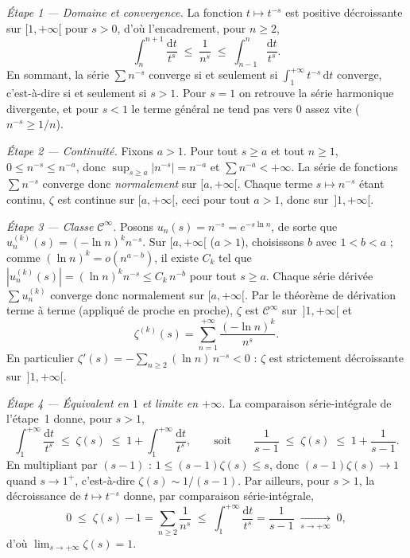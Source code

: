 \begin{mdframed}[style=proofbar]
  \textit{Étape 1 — Domaine et convergence.}
  La fonction $t\mapsto t^{-s}$ est positive décroissante sur $[1,+\infty[$ pour
  $s>0$, d'où l'encadrement, pour $n\geq 2$,
  \[
    \int_{n}^{n+1}\frac{\mathrm{d}t}{t^{s}}
    \;\leq\; \frac{1}{n^{s}}
    \;\leq\; \int_{n-1}^{n}\frac{\mathrm{d}t}{t^{s}}.
  \]
  En sommant, la série $\sum n^{-s}$ converge si et seulement si
  $\int_{1}^{+\infty} t^{-s}\,\mathrm{d}t$ converge, c'est-à-dire si et
  seulement si $s>1$. Pour $s=1$ on retrouve la série harmonique divergente, et
  pour $s<1$ le terme général ne tend pas vers $0$ assez vite ($n^{-s}\geq 1/n$).

  \medskip
  \textit{Étape 2 — Continuité.}
  Fixons $a>1$. Pour tout $s\geq a$ et tout $n\geq 1$, $0\leq n^{-s}\leq n^{-a}$,
  donc $\sup_{s\geq a}|n^{-s}|=n^{-a}$ et $\sum n^{-a}<+\infty$. La série de
  fonctions $\sum n^{-s}$ converge donc \emph{normalement} sur $[a,+\infty[$.
  Chaque terme $s\mapsto n^{-s}$ étant continu, $\zeta$ est continue sur
  $[a,+\infty[$, ceci pour tout $a>1$, donc sur $\,]1,+\infty[$.

  \medskip
  \textit{Étape 3 — Classe $\mathcal{C}^{\infty}$.}
  Posons $u_{n}(s)=n^{-s}=e^{-s\ln n}$, de sorte que $u_{n}^{(k)}(s)=(-\ln
  n)^{k}n^{-s}$. Sur $[a,+\infty[$ ($a>1$), choisissons $b$ avec
  $1<b<a$ ; comme $(\ln n)^{k}=o(n^{a-b})$, il existe $C_{k}$ tel que
  $|u_{n}^{(k)}(s)|=(\ln n)^{k}n^{-s}\leq C_{k}\,n^{-b}$ pour tout $s\geq a$.
  Chaque série dérivée $\sum u_{n}^{(k)}$ converge donc normalement sur
  $[a,+\infty[$. Par le théorème de dérivation terme à terme (appliqué de proche
  en proche), $\zeta$ est $\mathcal{C}^{\infty}$ sur $\,]1,+\infty[$ et
  \[
    \zeta^{(k)}(s)=\sum_{n=1}^{+\infty}\frac{(-\ln n)^{k}}{n^{s}}.
  \]
  En particulier $\zeta'(s)=-\sum_{n\geq 2}(\ln n)\,n^{-s}<0$ : $\zeta$ est
  strictement décroissante sur $\,]1,+\infty[$.

  \medskip
  \textit{Étape 4 — Équivalent en $1$ et limite en $+\infty$.}
  La comparaison série-intégrale de l'étape~1 donne, pour $s>1$,
  \[
    \int_{1}^{+\infty}\frac{\mathrm{d}t}{t^{s}}
    \;\leq\; \zeta(s)
    \;\leq\; 1+\int_{1}^{+\infty}\frac{\mathrm{d}t}{t^{s}},
    \qquad\text{soit}\qquad
    \frac{1}{s-1}\;\leq\;\zeta(s)\;\leq\;1+\frac{1}{s-1}.
  \]
  En multipliant par $(s-1)$ : $1\leq (s-1)\zeta(s)\leq s$, donc
  $(s-1)\zeta(s)\to 1$ quand $s\to 1^{+}$, c'est-à-dire
  $\zeta(s)\sim 1/(s-1)$. Par ailleurs, pour $s>1$, la décroissance de
  $t\mapsto t^{-s}$ donne, par comparaison série-intégrale,
  \[
    0\;\leq\; \zeta(s)-1=\sum_{n\geq 2}\frac{1}{n^{s}}
    \;\leq\; \int_{1}^{+\infty}\frac{\mathrm{d}t}{t^{s}}
    =\frac{1}{s-1}\;\xrightarrow[s\to+\infty]{}\;0,
  \]
  d'où $\lim_{s\to+\infty}\zeta(s)=1$.


\end{mdframed}
